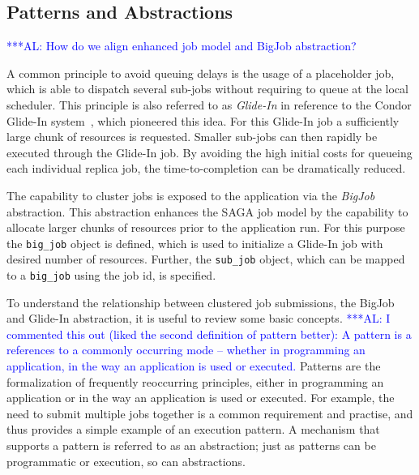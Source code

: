 \documentclass{rspublic}
\newcommand{\alnote}[1]{ {\textcolor{blue} { ***AL: #1 }}}
\newcommand{\alnote}[1]{}
\begin{document}
               
\subsection{Patterns and Abstractions}
\alnote{How do we align enhanced job model and BigJob abstraction?}

A common principle to avoid queuing delays is the usage of a placeholder job, 
which is able to dispatch several sub-jobs without requiring to queue 
at the local scheduler. This principle is also referred to as \emph{Glide-In} in 
reference to the Condor Glide-In system~\citep{citeulike:291860}, which pioneered 
this idea. For this Glide-In job a sufficiently large chunk of resources is requested. 
Smaller sub-jobs can then rapidly be executed through the Glide-In job. 
By avoiding the high initial costs for queueing each individual replica job, the
time-to-completion can be dramatically reduced.        

The capability to cluster jobs is exposed to the application via 
the \emph{BigJob} abstraction. This abstraction enhances the SAGA job 
model by the capability to allocate larger chunks of resources 
prior to the application run. For this purpose the \texttt{big\_job} 
object is defined, which is used to initialize a Glide-In job with 
desired number of resources.  Further, the \texttt{sub\_job} object, 
which can be mapped to a  \texttt{big\_job} using the job id, is
specified. 

To understand the relationship between clustered job submissions, the BigJob
and Gli\-de-In abstraction, it is useful to review some basic concepts.
\alnote{I commented this out (liked the second definition of pattern better): 
A pattern is a references to a commonly occurring mode --
whether in programming an application, in the way an application is
used or executed.} 
Patterns are the formalization of frequently reoccurring principles, 
either in programming an application or in the way an application is
used or executed. 
For example, the need to submit multiple jobs together is a
common requirement and practise, and thus provides a simple
example of an execution pattern.  A mechanism that supports a pattern
is referred to as an abstraction; just as patterns can be programmatic
or execution, so can abstractions.
\end{document}
